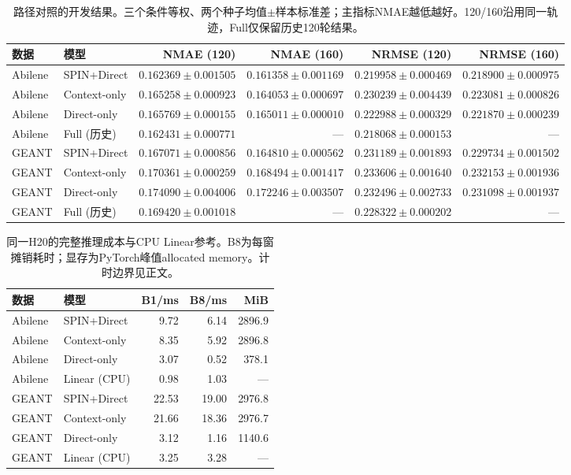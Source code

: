 \begin{table}[t]
\centering\small
\caption{路径对照的开发结果。三个条件等权、两个种子均值$\pm$样本标准差；主指标NMAE越低越好。120/160沿用同一轨迹，Full仅保留历史120轮结果。}
\label{tab:paths}
\begin{tabular}{llrrrr}
\toprule
数据 & 模型 & NMAE (120) & NMAE (160) & NRMSE (120) & NRMSE (160) \\
\midrule
Abilene & SPIN+Direct & $0.162369\pm0.001505$ & $0.161358\pm0.001169$ & $0.219958\pm0.000469$ & $0.218900\pm0.000975$ \\
Abilene & Context-only & $0.165258\pm0.000923$ & $0.164053\pm0.000697$ & $0.230239\pm0.004439$ & $0.223081\pm0.000826$ \\
Abilene & Direct-only & $0.165769\pm0.000155$ & $0.165011\pm0.000010$ & $0.222988\pm0.000329$ & $0.221870\pm0.000239$ \\
Abilene & Full (历史) & $0.162431\pm0.000771$ & --- & $0.218068\pm0.000153$ & --- \\
\midrule
GEANT & SPIN+Direct & $0.167071\pm0.000856$ & $0.164810\pm0.000562$ & $0.231189\pm0.001893$ & $0.229734\pm0.001502$ \\
GEANT & Context-only & $0.170361\pm0.000259$ & $0.168494\pm0.001417$ & $0.233606\pm0.001640$ & $0.232153\pm0.001936$ \\
GEANT & Direct-only & $0.174090\pm0.004006$ & $0.172246\pm0.003507$ & $0.232496\pm0.002733$ & $0.231098\pm0.001937$ \\
GEANT & Full (历史) & $0.169420\pm0.001018$ & --- & $0.228322\pm0.000202$ & --- \\
\bottomrule
\end{tabular}
\end{table}

\begin{table}[t]
\centering\small
\caption{同一H20的完整推理成本与CPU Linear参考。B8为每窗摊销耗时；显存为PyTorch峰值allocated memory。计时边界见正文。}
\label{tab:cost}
\begin{tabular}{llrrr}
\toprule
数据 & 模型 & B1/ms & B8/ms & MiB \\
\midrule
Abilene & SPIN+Direct & 9.72 & 6.14 & 2896.9 \\
Abilene & Context-only & 8.35 & 5.92 & 2896.8 \\
Abilene & Direct-only & 3.07 & 0.52 & 378.1 \\
Abilene & Linear (CPU) & 0.98 & 1.03 & — \\
\midrule
GEANT & SPIN+Direct & 22.53 & 19.00 & 2976.8 \\
GEANT & Context-only & 21.66 & 18.36 & 2976.7 \\
GEANT & Direct-only & 3.12 & 1.16 & 1140.6 \\
GEANT & Linear (CPU) & 3.25 & 3.28 & — \\
\bottomrule
\end{tabular}
\end{table}
